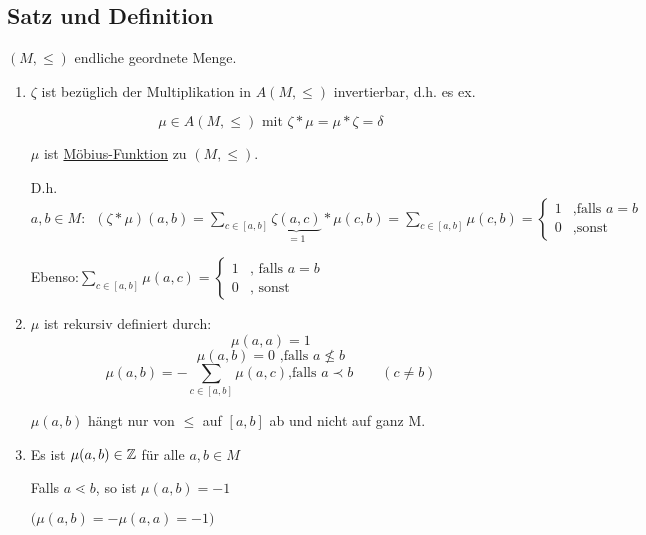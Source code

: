 \subsection{Satz und Definition}
$(M,\leq)$ endliche geordnete Menge.
\begin{enumerate}
	
	
	\item $\zeta$ ist bezüglich der Multiplikation in $A(M,\leq)$ invertierbar, d.h. es ex.
	
	$$ \mu \in A(M,\leq) \text{ mit } \zeta * \mu = \mu * \zeta = \delta$$
	
	$\mu$ ist \underline{Möbius-Funktion} zu $(M,\leq)$.
	
	D.h. $a,b \in M: \enspace (\zeta * \mu)(a,b) = \sum_{c\in [a,b]} \underbrace{\zeta(a,c)}_{=1}*\mu(c,b) = \sum_{c \in [a,b]}\mu(c,b) =\begin{cases}
	1& \text{,falls } a=b\\
	0& \text{,sonst}
	\end{cases}$
	
	Ebenso:$ \sum_{c \in [a,b]}\mu(a,c)= \begin{cases}
	1&\text{, falls }a=b\\
	0& \text{, sonst}
	\end{cases}$
	
	
	\item $\mu$ ist rekursiv definiert durch:
	$$\mu(a,a) =1$$
	$$\mu(a,b) = 0 \text{ ,falls } a\nleq b$$
	$$\mu(a,b) = -\sum_{c\in [a,b]}\mu(a,c) \text{,falls } a\prec b \qquad(c\neq b)$$
	
	$\mu(a,b)$ hängt nur von $\leq$ auf $[a,b]$ ab und nicht auf ganz M.
	
	\item Es ist $\mu(a,b) \in \operatorname{\mathbb{Z}}$ für alle $a,b \in M$
	
	Falls $a \lessdot b$, so ist $\mu(a,b) = -1$
	
	$\Big(\mu(a,b)=-\mu(a,a)=-1\Big)$
\end{enumerate}
